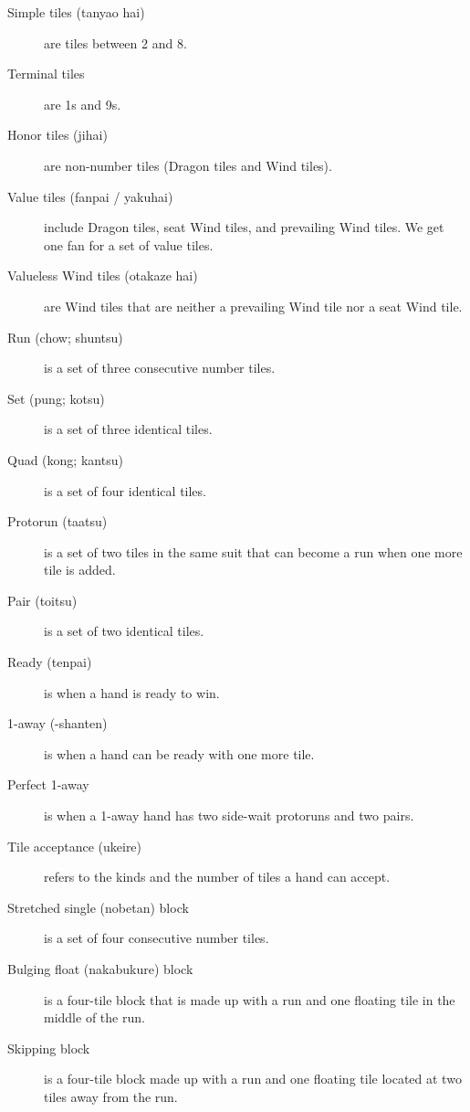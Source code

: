 \begin{description}
\item[Simple tiles ({\jap tanyao hai})] are tiles between 2 and 8.
\item[Terminal tiles] are 1s and 9s.
\item[Honor tiles ({\jap jihai})] are non-number tiles (Dragon tiles and Wind tiles).
\item[Value tiles ({\jap fanpai} / {\jap yakuhai})] include Dragon tiles, seat Wind tiles, and prevailing Wind tiles. We get one {\jap fan} for a set of value tiles. 
\item[Valueless Wind tiles ({\jap otakaze hai})] are Wind tiles that are neither a prevailing Wind tile nor a seat Wind tile.
\item[Run (chow; {\jap shuntsu})] is a set of three consecutive number tiles.
\item[Set (pung; {\jap kotsu})] is a set of three identical tiles. 
\item[Quad (kong; {\jap kantsu})] is a set of four identical tiles. 
\item[Protorun ({\jap taatsu})] is a set of two tiles in the same suit that can become a run when one more tile is added. 
\item[Pair ({\jap toitsu})] is a set of two identical tiles. 
\item[Ready ({\jap tenpai})] is when a hand is ready to win. 
\item[1-away ({-shanten})] is when a hand can be ready with one more tile. 
\item[Perfect 1-away] is when a 1-away hand has two side-wait protoruns and two pairs.
\item[Tile acceptance ({\jap ukeire})] refers to the kinds and the number of tiles a hand can accept.
\item[Stretched single ({\jap nobetan}) block] is a set of four consecutive number tiles. 
\item[Bulging float ({\jap nakabukure}) block] is a four-tile block that is made up with a run and one floating tile in the middle of the run.
\item[Skipping block] is a four-tile block made up with a run and one floating tile located at two tiles away from the run.
\end{description}
